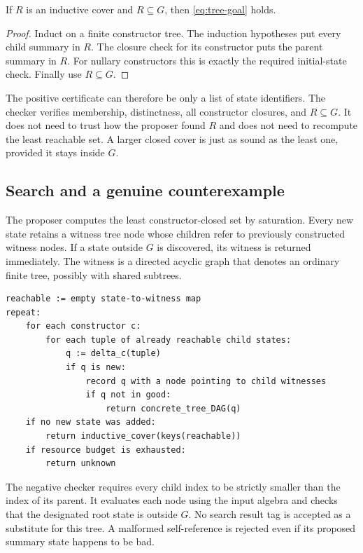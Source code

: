 \begin{theorem}
\label{thm:finite-cover}
If $R$ is an inductive cover and $R\subseteq G$, then \eqref{eq:tree-goal} holds.
\end{theorem}
\begin{proof}
Induct on a finite constructor tree. The induction hypotheses put every child
summary in $R$. The closure check for its constructor puts the parent summary
in $R$. For nullary constructors this is exactly the required initial-state
check. Finally use $R\subseteq G$.
\end{proof}

The positive certificate can therefore be only a list of state identifiers.
The checker verifies membership, distinctness, all constructor closures, and
$R\subseteq G$. It does not need to trust how the proposer found $R$ and does
not need to recompute the least reachable set. A larger closed cover is just as
sound as the least one, provided it stays inside $G$.

\subsection{Search and a genuine counterexample}
The proposer computes the least constructor-closed set by saturation. Every
new state retains a witness tree node whose children refer to previously
constructed witness nodes. If a state outside $G$ is discovered, its witness is
returned immediately. The witness is a directed acyclic graph that denotes an
ordinary finite tree, possibly with shared subtrees.

\begin{lstlisting}
reachable := empty state-to-witness map
repeat:
    for each constructor c:
        for each tuple of already reachable child states:
            q := delta_c(tuple)
            if q is new:
                record q with a node pointing to child witnesses
                if q not in good:
                    return concrete_tree_DAG(q)
    if no new state was added:
        return inductive_cover(keys(reachable))
    if resource budget is exhausted:
        return unknown
\end{lstlisting}

The negative checker requires every child index to be strictly smaller than the
index of its parent. It evaluates each node using the input algebra and checks
that the designated root state is outside $G$. No search result tag is accepted
as a substitute for this tree. A malformed self-reference is rejected even if
its proposed summary state happens to be bad.

